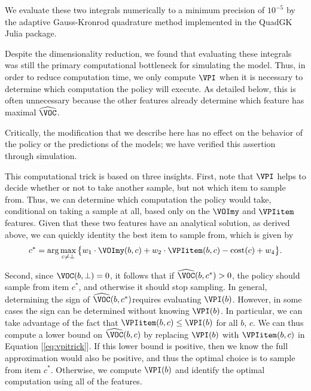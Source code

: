 We evaluate these two integrals numerically to a minimum precision of $10^{-5}$ by the adaptive Gauss-Kronrod quadrature method implemented in the QuadGK Julia package.

Despite the dimensionality reduction, we found that evaluating these integrals was still the primary computational bottleneck for simulating the model. Thus, in order to reduce computation time, we only compute $\VPI$ when it is necessary to determine which computation the policy will execute. As detailed below, this is often unnecessary because the other features already determine which feature has maximal $\widehat{\VOC}$.

Critically, the modification that we describe here has no effect on the behavior of the policy or the predictions of the models; we have verified this assertion through simulation.

This computational trick is based on three insights. First, note that $\VPI$ helps to decide whether or not to take another sample, but not which item to sample from. Thus, we can determine which computation the policy would take, conditional on taking a sample at all, based only on the $\VOImy$ and $\VPIitem$ features. Given that these two features have an analytical solution, as derived above, we can quickly identity the best item to sample from, which is given by
%
\begin{equation}
\label{eq:vpitrick}
  c^{*}= \arg\max_{c\neq\bot} \big\{ 
    w_{1}\cdot\VOImy(b,c)+w_{2}\cdot \VPIitem(b,c)
    - \text{cost}(c)+w_{4} \big\} .
\end{equation}
%

Second, since $\VOC(b,\bot)=0$, it follows that if $\widehat{\VOC}(b,c^{*})>0$, the policy should sample from item $c^{*}$, and otherwise it should stop sampling. In general, determining the sign of $\widehat{\VOC}(b,c^{*})$requires evaluating $\VPI(b)$. However, in some cases the sign can be determined without knowing $\VPI(b)$. In particular, we can take advantage of the fact that $\VPIitem(b,c)\leq \VPI(b)$ for all $b$, $c$. We can thus compute a lower bound on $\widehat{\VOC}(b,c)$ by replacing $\VPI(b)$ with $\VPIitem(b,c)$ in Equation [\ref{eq:vpitrick}]. If this lower bound is positive, then we know the full approximation would also be positive, and thus the optimal choice is to sample from item $c^{*}$. Otherwise, we compute $\VPI(b)$ and identify the optimal computation using all of the features.


